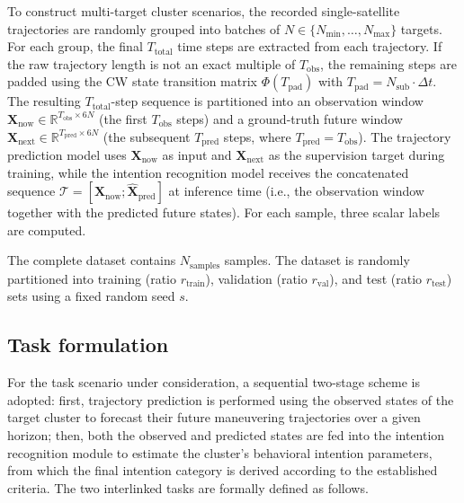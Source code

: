 \documentclass[a4paper,fleqn]{cas-dc}
\newcommand{\biPhi}{\bm{\mathit{\Phi}}} %
\begin{document}
To construct multi-target cluster scenarios, the recorded single-satellite trajectories are randomly grouped into batches of $N \in \{N_{\min}, \dots, N_{\max}\}$ targets. For each group, the final $T_{\text{total}}$ time steps are extracted from each trajectory. If the raw trajectory length is not an exact multiple of $T_{\text{obs}}$, the remaining steps are padded using the CW state transition matrix $\biPhi(T_{\text{pad}})$ with $T_{\text{pad}} = N_{\text{sub}} \cdot \Delta t$. The resulting $T_{\text{total}}$-step sequence is partitioned into an observation window $\bm{X}_{\text{now}} \in \mathbb{R}^{T_{\text{obs}} \times 6N}$ (the first $T_{\text{obs}}$ steps) and a ground-truth future window $\bm{X}_{\text{next}} \in \mathbb{R}^{T_{\text{pred}} \times 6N}$ (the subsequent $T_{\text{pred}}$ steps, where $T_{\text{pred}} = T_{\text{obs}}$). The trajectory prediction model uses $\bm{X}_{\text{now}}$ as input and $\bm{X}_{\text{next}}$ as the supervision target during training, while the intention recognition model receives the concatenated sequence $\mathcal{T} = [\bm{X}_{\text{now}}; \hat{\bm{X}}_{\text{pred}}]$ at inference time (i.e., the observation window together with the predicted future states). For each sample, three scalar labels are computed.

The complete dataset contains $N_{\text{samples}}$ samples. The dataset is randomly partitioned into training (ratio $r_{\text{train}}$), validation (ratio $r_{\text{val}}$), and test (ratio $r_{\text{test}}$) sets using a fixed random seed $s$.

\subsection{Task formulation}

For the task scenario under consideration, a sequential two-stage scheme is adopted: first, trajectory prediction is performed using the observed states of the target cluster to forecast their future maneuvering trajectories over a given horizon; then, both the observed and predicted states are fed into the intention recognition module to estimate the cluster's behavioral intention parameters, from which the final intention category is derived according to the established criteria. The two interlinked tasks are formally defined as follows.
\end{document}
